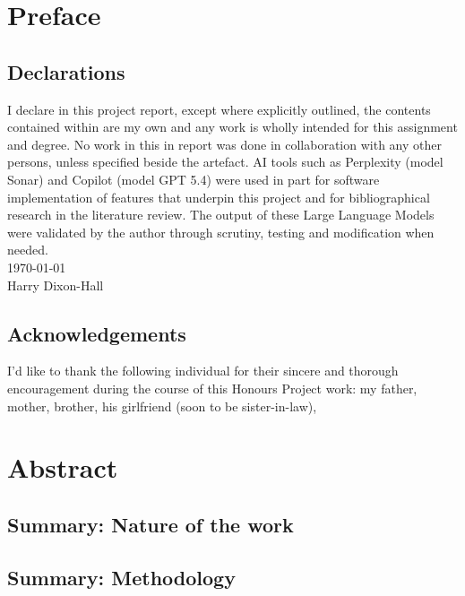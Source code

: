 \documentclass{article}
\begin{document}
\tableofcontents
\newpage

\listoffigures
\newpage

\listoftables
\newpage

\section{Preface}
\subsection{Declarations}
I declare in this project report, except where explicitly outlined, the contents contained within are my own and any work is wholly intended for this assignment and degree. No work in this in report was done in collaboration with any other persons, unless specified beside the artefact. AI tools such as Perplexity (model Sonar) and Copilot (model GPT 5.4) were used in part for software implementation of features that underpin this project and for bibliographical research in the literature review. The output of these Large Language Models were validated by the author through scrutiny, testing and modification when needed. \\
\small{\today} \\
\small{Harry Dixon-Hall}
 
\subsection{Acknowledgements}
I'd like to thank the following individual for their sincere and thorough encouragement during the course of this Honours Project work: my father, mother, brother, his girlfriend (soon to be sister-in-law),

\section{Abstract} %

\subsection{Summary: Nature of the work}
\subsection{Summary: Methodology}
\end{document}
